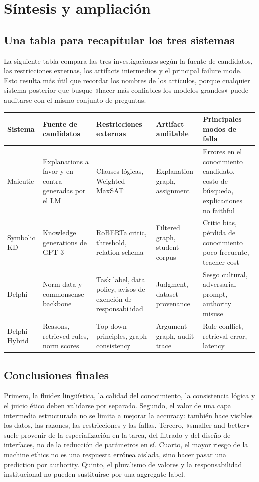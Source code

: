 \section{Síntesis y ampliación}

\subsection{Una tabla para recapitular los tres sistemas}

La siguiente tabla compara las tres investigaciones según la fuente de candidatos, las restricciones externas, los artifacts intermedios y el principal failure mode. Esto resulta más útil que recordar los nombres de los artículos, porque cualquier sistema posterior que busque «hacer más confiables los modelos grandes» puede auditarse con el mismo conjunto de preguntas.

\begin{longtable}{@{}L{0.13\textwidth}L{0.16\textwidth}L{0.19\textwidth}L{0.18\textwidth}L{0.19\textwidth}@{}}
\toprule
Sistema & Fuente de candidatos & Restricciones externas & Artifact auditable & Principales modos de falla \\
\midrule
Maieutic & Explanations a favor y en contra generadas por el LM & Clauses lógicas, Weighted MaxSAT & Explanation graph, assignment & Errores en el conocimiento candidato, costo de búsqueda, explicaciones no faithful \\
Symbolic KD & Knowledge generations de GPT-3 & RoBERTa critic, threshold, relation schema & Filtered graph, student corpus & Critic bias, pérdida de conocimiento poco frecuente, teacher cost \\
Delphi & Norm data y commonsense backbone & Task label, data policy, avisos de exención de responsabilidad & Judgment, dataset provenance & Sesgo cultural, adversarial prompt, authority misuse \\
Delphi Hybrid & Reasons, retrieved rules, norm scores & Top-down principles, graph consistency & Argument graph, audit trace & Rule conflict, retrieval error, latency \\
\bottomrule
\end{longtable}

\subsection{Conclusiones finales}

Primero, la fluidez lingüística, la calidad del conocimiento, la consistencia lógica y el juicio ético deben validarse por separado. Segundo, el valor de una capa intermedia estructurada no se limita a mejorar la accuracy: también hace visibles los datos, las razones, las restricciones y las fallas. Tercero, «smaller and better» suele provenir de la especialización en la tarea, del filtrado y del diseño de interfaces, no de la reducción de parámetros en sí. Cuarto, el mayor riesgo de la machine ethics no es una respuesta errónea aislada, sino hacer pasar una prediction por authority. Quinto, el pluralismo de valores y la responsabilidad institucional no pueden sustituirse por una aggregate label.


